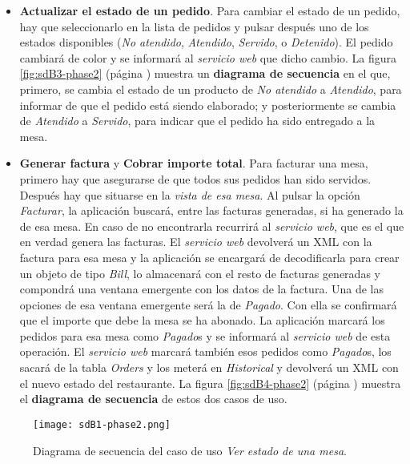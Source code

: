 \begin{itemize}
\item \textbf{Actualizar el estado de un pedido}. Para cambiar el estado de
un pedido, hay que seleccionarlo en la lista de pedidos y pulsar después uno
de los estados disponibles (\emph{No atendido}, \emph{Atendido},
\emph{Servido}, o \emph{Detenido}). El pedido cambiará de color y se informará
al \emph{servicio web} que dicho cambio.
La figura \ref{fig:sdB3-phase2} (página \pageref{fig:sdB3-phase2}) muestra
un \textbf{diagrama de secuencia} en el que, primero, se cambia el estado de
un producto de \emph{No atendido} a \emph{Atendido}, para informar de que
el pedido está siendo elaborado; y posteriormente se cambia de \emph{Atendido}
a \emph{Servido}, para indicar que el pedido ha sido entregado a la mesa.

\item \textbf{Generar factura} y  \textbf{Cobrar importe total}. Para
facturar una mesa, primero hay que asegurarse de que todos sus pedidos han
sido servidos. Después hay que situarse en la \emph{vista de esa mesa}.
Al pulsar la opción \emph{Facturar}, la aplicación buscará, entre las facturas
generadas, si ha generado la de esa mesa. En caso de no encontrarla recurrirá
al \emph{servicio web}, que es el que en verdad genera las facturas. El
\emph{servicio web} devolverá un \acs{XML} con la factura para esa mesa y la 
aplicación se encargará de decodificarla para crear un objeto de tipo
\emph{Bill}, lo almacenará con el resto de facturas generadas y compondrá
una ventana emergente con los datos de la factura. Una de las opciones de
esa ventana emergente será la de \emph{Pagado}. Con ella se confirmará que
el importe que debe la mesa se ha abonado. La aplicación marcará los
pedidos para esa mesa como \emph{Pagado}s y se informará al \emph{servicio
web} de esta operación. El \emph{servicio web} marcará también esos pedidos
como \emph{Pagado}s, los sacará de la tabla \emph{Orders} y los meterá en
\emph{Historical} y devolverá un \acs{XML} con el nuevo estado del
restaurante. La figura \ref{fig:sdB4-phase2} (página \pageref{fig:sdB4-phase2})
muestra el \textbf{diagrama de secuencia} de estos dos casos de uso.
\end{itemize}

  \begin{sidewaysfigure}[h]
    \begin{center}
      \texttt{[image: sdB1-phase2.png]}
      \caption{Diagrama de secuencia del caso de uso \emph{Ver estado de
      una mesa}.}
      \label{fig:sdB1-phase2}
    \end{center}
  \end{sidewaysfigure}

